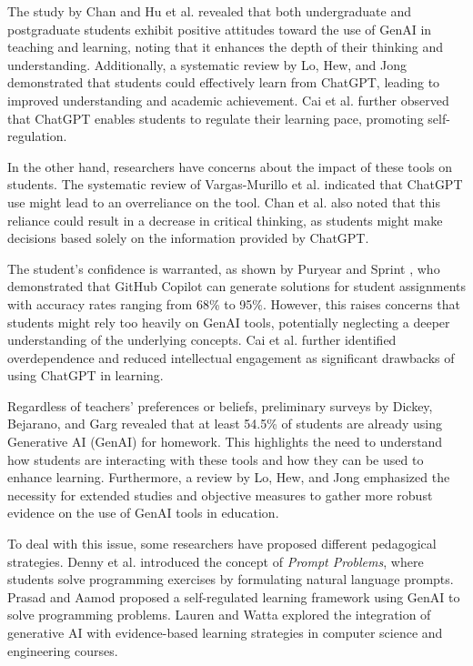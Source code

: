 \documentclass[conference]{IEEEtran}
\begin{document}
The study by Chan and Hu et al. \cite{chan23} revealed that both undergraduate
and postgraduate students exhibit positive attitudes toward the use of GenAI
in teaching and learning, noting that it enhances the depth of their thinking
and understanding. Additionally, a systematic review by Lo, Hew, and Jong
\cite{Lo24} demonstrated that students could effectively learn from ChatGPT,
leading to improved understanding and academic achievement. Cai et al.
\cite{cai23} further observed that ChatGPT enables students to regulate their
learning pace, promoting self-regulation.

In the other hand, researchers have concerns about the impact of these
tools on students. The systematic review of Vargas-Murillo et al.
\cite{Murillo23} indicated that ChatGPT use might lead to an overreliance on the
tool. Chan et al. \cite{chan23} also noted that this reliance could result in a
decrease in critical thinking, as students might make decisions based solely on
the information provided by ChatGPT.

The student's confidence is warranted, as shown by Puryear and Sprint
\cite{Puryear22}, who demonstrated that GitHub Copilot can generate solutions
for student assignments with accuracy rates ranging from 68\% to 95\%. However,
this raises concerns that students might rely too heavily on GenAI tools,
potentially neglecting a deeper understanding of the underlying concepts.
Cai et al. \cite{cai23} further identified overdependence and reduced
intellectual engagement as significant drawbacks of using ChatGPT in learning.

Regardless of teachers' preferences or beliefs, preliminary surveys by Dickey,
Bejarano, and Garg \cite{Dickey24} revealed that at least 54.5\% of students are
already using Generative AI (GenAI) for homework. This highlights the need to
understand how students are interacting with these tools and how they can be
used to enhance learning. Furthermore, a review by Lo, Hew, and Jong \cite{Lo24}
emphasized the necessity for extended studies and objective measures to gather
more robust evidence on the use of GenAI tools in education.


To deal with this issue, some researchers have proposed different pedagogical
strategies. Denny et al. \cite{Denny24} introduced the concept of \textit{Prompt
Problems}, where students solve programming exercises by formulating natural
language prompts. Prasad and Aamod \cite{Prasad24} proposed a self-regulated
learning framework using GenAI to solve programming problems. Lauren and Watta
\cite{Lauren23} explored the integration of generative AI with evidence-based
learning strategies in computer science and engineering courses.
\end{document}
